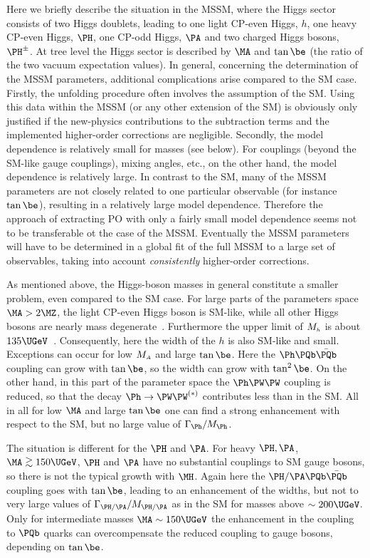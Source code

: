 Here we briefly describe the situation in the MSSM, where the Higgs sector
consists of two Higgs doublets, leading to one light CP-even Higgs, $h$, one
heavy CP-even Higgs, $\PH$, one CP-odd Higgs, $\PA$ and two charged Higgs
bosons, $\PH^\pm$. At tree level the Higgs sector is described by $\MA$ and 
$\tan\be$ (the ratio of the two vacuum expectation values).
In general, concerning the determination of the MSSM parameters,
additional complications arise compared to the SM case. 
Firstly, the unfolding procedure often involves the assumption of the
SM. Using this data within the MSSM (or any other extension of the SM) is
obviously only justified if the new-physics contributions to the subtraction
terms and the implemented higher-order corrections are negligible. 
Secondly, the model dependence is
relatively small for masses (see below). For couplings (beyond the SM-like
gauge couplings), mixing angles, etc., on the other hand, the model dependence
is relatively large. In contrast to the SM, many of the MSSM parameters are
not closely related to one particular observable (for instance $\tan\be$),
resulting in a relatively large model dependence. Therefore the approach of
extracting PO with only a fairly small model dependence seems not to be
transferable ot the case of the MSSM. Eventually the MSSM parameters will have
to be determined in a global fit of the full MSSM to a large set of
observables, taking into account {\em consistently} higher-order corrections.

As mentioned above, the Higgs-boson masses in general constitute a
smaller problem, even compared to the SM case.
For large parts of the parameters space $\MA > 2 \MZ$, the light
CP-even Higgs boson is SM-like, while all other Higgs bosons are nearly mass
degenerate~\cite{Gunion:1989we}. Furthermore the upper limit of $M_{{\scriptscriptstyle{h}}}$ is
about $135 \UGeV$~\cite{Degrassi:2002fi}.
Consequently, here the width of the $h$ is also SM-like and small. 
Exceptions can occur for low $M_{{\scriptscriptstyle{A}}}$ and large $\tan\be$. 
Here the $\Ph \PQb\bar\PQb$ coupling can grow with $\tan\be$, so the width can
grow with $\tan^2\be$. 
On the other hand, in this part of the parameter space the $\Ph\PW\PW$ coupling
is reduced, so that the decay $\Ph \to \PW\PW^{(*)}$ contributes less than in
the SM. All in all for low $\MA$ and large $\tan\be$ one can find a strong 
enhancement with respect to the SM, but no large value of 
$\Gamma_{\Ph}/M_{\Ph}$. 

The situation is different for the $\PH$ and $\PA$. 
For heavy $\PH,\PA$, $\MA \gsim 150 \UGeV$, $\PH$ and $\PA$ have
no  substantial couplings to SM gauge bosons, so there is not the typical
growth with $\MH$. 
Again here the $\PH/\PA \PQb\bar\PQb$ coupling goes with $\tan\be$, leading to
an enhancement of the widths, but not to very large values of 
$\Gamma_{\PH/\PA}/M_{\PH/\PA}$ as in the SM for masses above $\sim 200 \UGeV$.
Only for intermediate masses $\MA \sim 150 \UGeV$ the enhancement in the
coupling to $\PQb$ quarks can overcompensate the reduced coupling to gauge
bosons, depending on $\tan\be$. 

